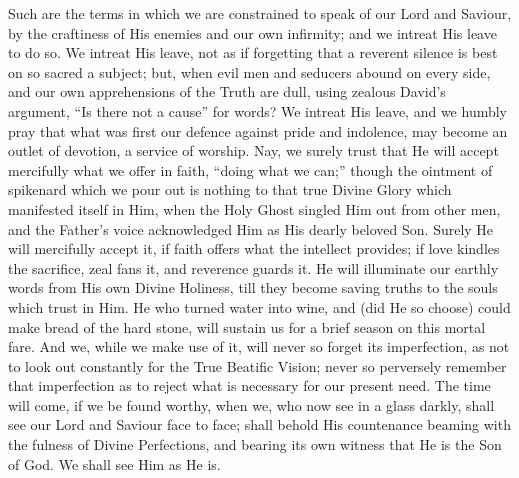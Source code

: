 Such are the terms in which we are constrained to speak of our Lord
and Saviour, by the craftiness of His enemies and our own infirmity;
and we intreat His leave to do so. We intreat His leave, not as if
forgetting that a reverent silence is best on so sacred a subject;
but, when evil men and seducers abound on every side, and our own
apprehensions of the Truth are dull, using zealous David's argument,
``Is there not a cause'' for words? We intreat His leave, and
we humbly pray that what was first our defence against pride and
indolence, may become an outlet of devotion, a service of worship.
Nay, we surely trust that He will accept mercifully what we offer in
faith, ``doing what we can;'' though the ointment of spikenard
which we pour out is nothing to that true Divine Glory which
manifested itself in Him, when the Holy Ghost singled Him out from
other men, and the Father's voice acknowledged Him as His dearly
beloved Son. Surely He will mercifully accept it, if faith offers what
the intellect provides; if love kindles the sacrifice, zeal fans it,
and reverence guards it. He will illuminate our earthly words from His
own Divine Holiness, till they become saving truths to the souls which
trust in Him. He who turned water into wine, and (did He so choose)
could make bread of the hard stone, will sustain us for a brief season
on this mortal fare. And we, while we make use of it, will never so
forget its imperfection, as not to look out constantly for the True
Beatific Vision; never so perversely remember that imperfection as to
reject what is necessary for our present need. The time will come, if
we be found worthy, when we, who now see in a glass darkly, shall see
our Lord and Saviour face to face; shall behold His countenance
beaming with the fulness of Divine Perfections, and bearing its own
witness that He is the Son of God. We shall see Him as He is.

